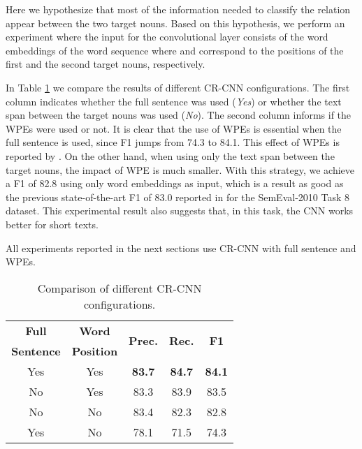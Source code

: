 \documentclass[11pt]{article}
\begin{document}
Here we hypothesize that most of the information needed to classify the relation appear between the two target nouns.
Based on this hypothesis, 
we perform an experiment where the input for the convolutional layer consists of the word embeddings of the word sequence  where  and  correspond to the positions of the first and the second target nouns, respectively. 

In Table \ref{tab:res:text_span} we compare the results of different CR-CNN configurations.
The first column indicates whether the full sentence was used (\emph{Yes}) or whether the text span between the target nouns was used (\emph{No}). 
The second column informs if the WPEs were used or not.
It is clear that the use of WPEs is essential when the full sentence is used,
since F1 jumps from 74.3 to 84.1.
This effect of WPEs is reported by \cite{zeng2014:coling}.
On the other hand,
when using only the text span between the target nouns,
the impact of WPE is much smaller.
With this strategy,
we achieve a F1 of 82.8 using only word embeddings as input, 
which is a result as good as the previous state-of-the-art F1 of 83.0 reported in \cite{yu2014} for the SemEval-2010 Task 8 dataset.
This experimental result also suggests that,
in this task,
the CNN works better for short texts.

All experiments reported in the next sections use CR-CNN with full sentence and WPEs.

\begin{table}[h!]
\begin{center}
\begin{tabular}{|c|c|ccc|}
\hline  \bf Full  & \bf Word & \multirow{2}{*}{\bf Prec.} & \multirow{2}{*}{\bf Rec.} & \multirow{2}{*}{\bf F1} \\ 
     \bf Sentence & \bf Position & & & \\
\hline
Yes & Yes & \bf 83.7 & \bf 84.7 & \bf 84.1 \\
No  & Yes & 83.3 & 83.9 & 83.5 \\
No  & No  & 83.4 & 82.3 & 82.8 \\
Yes & No  & 78.1 & 71.5 & 74.3\\
\hline
\end{tabular}
\end{center}
\caption{\label{tab:res:text_span} Comparison of different CR-CNN configurations. }
\end{table}
\end{document}

